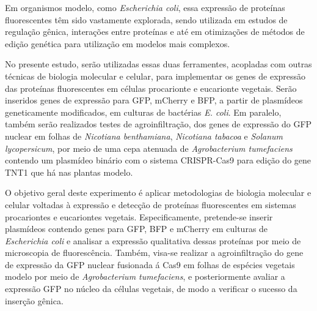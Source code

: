 Em organismos modelo, como \textit{Escherichia coli}, essa expressão de proteínas fluorescentes têm sido vastamente explorada, sendo utilizada em estudos de regulação gênica, interações entre proteínas e até em otimizações de métodos de edição genética para utilização em modelos mais complexos\cite{ruiz_silhavy_2022}. 

No presente estudo, serão utilizadas essas duas ferramentes, acopladas com outras técnicas de biologia molecular e celular, para implementar os genes de expressão das proteínas fluorescentes em células procarionte e eucarionte vegetais. Serão inseridos genes de expressão para GFP, mCherry e BFP, a partir de plasmídeos geneticamente modificados, em culturas de bactérias \textit{E. coli}. Em paralelo, também serão realizados testes de agroinfiltração, dos genes de expressão do GFP nuclear em folhas de \textit{Nicotiana benthamiana}, \textit{Nicotiana tabacoa} e \textit{Solanum lycopersicum}, por meio de uma cepa atenuada de \textit{Agrobacterium tumefaciens} contendo um plasmídeo binário com o sistema CRISPR-Cas9 para edição do gene TNT1 que há nas plantas modelo\cite{hernández-pinzón_2012}.

O objetivo geral deste experimento é aplicar metodologias de biologia molecular e celular voltadas à expressão e detecção de proteínas fluorescentes em sistemas procariontes e eucariontes vegetais. Especificamente, pretende-se inserir plasmídeos contendo genes para GFP, BFP e mCherry em culturas de \textit{Escherichia coli}  e analisar a expressão qualitativa dessas proteínas por meio de microscopia de fluorescência. Também, visa-se realizar a  agroinfiltração do gene de expressão da GFP nuclear fusionada á Cas9 em folhas de espécies vegetais modelo por meio de \textit{Agrobacterium tumefaciens}, e posteriormente avaliar a expressão GFP no núcleo da células vegetais, de modo a verificar o sucesso da inserção gênica. 
